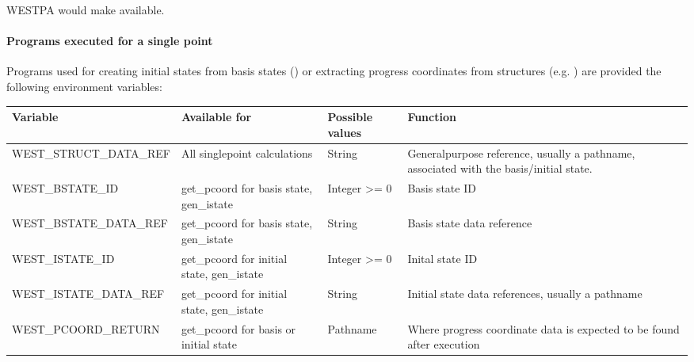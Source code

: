 \documentclass[letterpaper,10pt,english]{sphinxmanual}
\begin{document}
\begin{sphinxVerbatim}[commandchars=\\\{\}]
     
        
\end{sphinxVerbatim}

WESTPA would make  available.


\paragraph{Programs executed for a single point}
\label{\detokenize{users_guide/west/setup:programs-executed-for-a-single-point}}
Programs used for creating initial states from basis states ()
or extracting progress coordinates from structures (e.g. ) are
provided the following environment variables:


\begin{savenotes}\sphinxattablestart
\centering
\begin{tabulary}{\linewidth}[t]{|T|T|T|T|}
\hline
\sphinxstyletheadfamily 
Variable
&\sphinxstyletheadfamily 
Available for
&\sphinxstyletheadfamily 
Possible values
&\sphinxstyletheadfamily 
Function
\\
\hline
WEST\_STRUCT\_DATA\_REF
&
All
single\sphinxhyphen{}point
calculations
&
String
&
General\sphinxhyphen{}purpose
reference, usually a
pathname, associated
with the basis/initial
state.
\\
\hline
WEST\_BSTATE\_ID
&
get\_pcoord for
basis state,
gen\_istate
&
Integer \textgreater{}= 0
&
Basis state ID
\\
\hline
WEST\_BSTATE\_DATA\_REF
&
get\_pcoord for
basis state,
gen\_istate
&
String
&
Basis state data
reference
\\
\hline
WEST\_ISTATE\_ID
&
get\_pcoord for
initial state,
gen\_istate
&
Integer \textgreater{}= 0
&
Inital state ID
\\
\hline
WEST\_ISTATE\_DATA\_REF
&
get\_pcoord for
initial state,
gen\_istate
&
String
&
Initial state data
references, usually a
pathname
\\
\hline
WEST\_PCOORD\_RETURN
&
get\_pcoord for
basis or
initial state
&
Pathname
&
Where progress
coordinate data is
expected to be found
after execution
\\
\hline
\end{tabulary}
\par
\sphinxattableend\end{savenotes}
\end{document}
